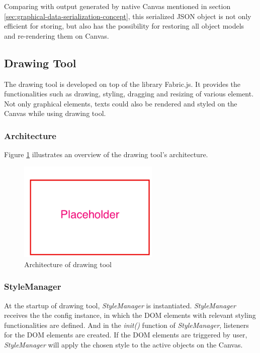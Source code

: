 Comparing with output generated by native Canvas mentioned in section \ref{sec:graphical-data-serialization-concept}, this serialized JSON object is not only efficient for storing, but also has the possibility for restoring all object models and re-rendering them on Canvas.

\subsection{Drawing Tool}
The drawing tool is developed on top of the library Fabric.js. It provides the functionalities such as drawing, styling, dragging and resizing of various element. Not only graphical elements, texts could also be rendered and styled on the Canvas while using drawing tool.

\subsubsection{Architecture}


Figure \ref{fig:drawing-tool-arc-imp} illustrates an overview of the drawing tool's architecture. 

\begin{figure}[!htbp]
  \centering
    \includegraphics[width=0.6\textwidth]{Figures/placeholder.png}
  \caption{Architecture of drawing tool}
  \label{fig:drawing-tool-arc-imp}
\end{figure}

\subsubsection{StyleManager}
At the startup of drawing tool, \textit{StyleManager} is instantiated. \textit{StyleManager} receives the the config instance, in which the DOM elements with relevant styling functionalities are defined. And in the \textit{init()} function of \textit{StyleManager}, listeners for the DOM elements are created. If the DOM elements are triggered by user, \textit{StyleManager} will apply the chosen style to the active objects on the Canvas.

